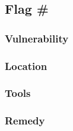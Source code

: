 \subsection{Flag \#}

\subsubsection{Vulnerability}

\subsubsection{Location}

\subsubsection{Tools}

\subsubsection{Remedy}